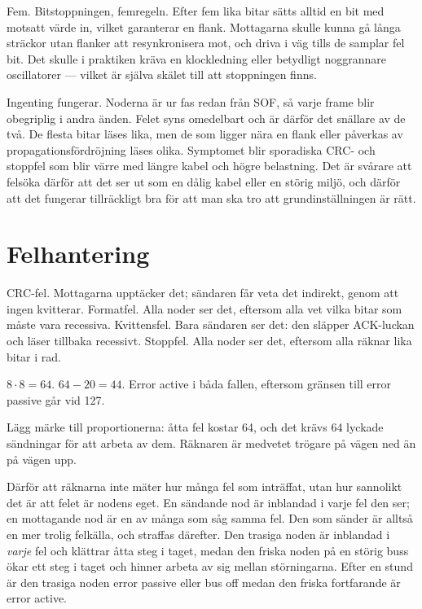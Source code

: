  Fem.
 Bitstoppningen, femregeln. Efter fem lika bitar sätts alltid en bit med motsatt värde in,
vilket garanterar en flank.
 Mottagarna skulle kunna gå långa sträckor utan flanker att resynkronisera mot, och driva
i väg tills de samplar fel bit. Det skulle i praktiken kräva en klockledning eller betydligt
noggrannare oscillatorer --- vilket är själva skälet till att stoppningen finns.

 Ingenting fungerar. Noderna är ur fas redan från SOF, så varje frame blir obegriplig i
andra änden. Felet syns omedelbart och är därför det snällare av de två.
 De flesta bitar läses lika, men de som ligger nära en flank eller påverkas av
propagationsfördröjning läses olika. Symptomet blir sporadiska CRC- och stoppfel som blir värre
med längre kabel och högre belastning. Det är svårare att felsöka därför att det ser ut som en
dålig kabel eller en störig miljö, och därför att det fungerar tillräckligt bra för att man ska
tro att grundinställningen är rätt.

\section{Felhantering}

 CRC-fel. Mottagarna upptäcker det; sändaren får veta det indirekt, genom att ingen
kvitterar.
 Formatfel. Alla noder ser det, eftersom alla vet vilka bitar som måste vara recessiva.
 Kvittensfel. Bara sändaren ser det: den släpper ACK-luckan och läser tillbaka recessivt.
 Stoppfel. Alla noder ser det, eftersom alla räknar lika bitar i rad.

 $8 \cdot 8 = 64$.
 $64 - 20 = 44$.
 Error active i båda fallen, eftersom gränsen till error passive går vid 127.

Lägg märke till proportionerna: åtta fel kostar 64, och det krävs 64 lyckade sändningar för att
arbeta av dem. Räknaren är medvetet trögare på vägen ned än på vägen upp.

 Därför att räknarna inte mäter hur många fel som inträffat, utan hur sannolikt det är att
felet är nodens eget. En sändande nod är inblandad i varje fel den ser; en mottagande nod är en av
många som såg samma fel. Den som sänder är alltså en mer trolig felkälla, och straffas därefter.
 Den trasiga noden är inblandad i \emph{varje} fel och klättrar åtta steg i taget, medan
den friska noden på en störig buss ökar ett steg i taget och hinner arbeta av sig mellan
störningarna. Efter en stund är den trasiga noden error passive eller bus off medan den friska
fortfarande är error active.

